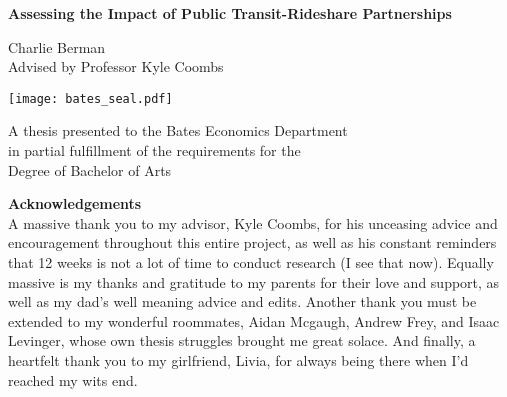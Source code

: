 \documentclass [12pt]{report}
\begin{document}
\begin{titlepage}
    \begin{center}
        \vspace*{1cm}
            
        \Huge
        \textbf{Assessing the Impact of Public Transit-Rideshare Partnerships}
        
            
            
        \vspace{1cm}
        \large
        Charlie Berman\\
        Advised by Professor Kyle Coombs
        \vspace{0.5cm}

                                
        \texttt{[image: bates\_seal.pdf]}

        \vspace{0.6cm}
        \normalsize
        A thesis presented to the Bates Economics Department\\
        in partial fulfillment of the requirements for the\\
        Degree of Bachelor of Arts

        

        
    \end{center}
\end{titlepage}

\begin{center}
    \Large
    \textbf{Acknowledgements}\\
    \linespread{1.5}
    \normalsize  
     A massive thank you to my advisor, Kyle Coombs, for his unceasing advice and encouragement throughout this entire project, as well as his constant reminders that 12 weeks is not a lot of time to conduct research (I see that now). Equally massive is my thanks and gratitude to my parents for their love and support, as well as my dad's well meaning advice and edits. Another thank you must be extended to my wonderful roommates, Aidan Mcgaugh, Andrew Frey, and Isaac Levinger, whose own thesis struggles brought me great solace. And finally, a heartfelt thank you to my girlfriend, Livia, for always being there when I'd reached my wits end.  
\end{center}
\tableofcontents
\newpage

\end{document}
